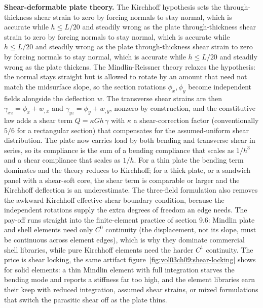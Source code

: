 \begin{mastery}
\textbf{Shear-deformable plate theory.} The Kirchhoff hypothesis sets the
through-thickness shear strain to zero by forcing normals to stay normal,
which is accurate while $h \le L/20$ and steadily wrong as the plate
through-thickness shear strain to zero by forcing normals to stay normal,
which is accurate while $h \le L/20$ and steadily wrong as the plate
through-thickness shear strain to zero by forcing normals to stay normal,
which is accurate while $h \le L/20$ and steadily wrong as the plate
thickens. The Mindlin-Reissner theory relaxes the hypothesis: the normal
stays straight but is allowed to rotate by an amount that need not match
the midsurface slope, so the section rotations $\phi_x, \phi_y$ become
independent fields alongside the deflection $w$. The transverse shear
strains are then $\gamma_{xz} = \phi_x + w_{,x}$ and $\gamma_{yz} = \phi_y
+ w_{,y}$, nonzero by construction, and the constitutive law adds a shear
term $Q = \kappa G h\,\gamma$ with $\kappa$ a shear-correction factor
(conventionally $5/6$ for a rectangular section) that compensates for the
assumed-uniform shear distribution. The plate now carries load by both
bending and transverse shear in series, so its compliance is the sum of a
bending compliance that scales as $1/h^3$ and a shear compliance that
scales as $1/h$. For a thin plate the bending term dominates and the theory
reduces to Kirchhoff; for a thick plate, or a sandwich panel with a
shear-soft core, the shear term is comparable or larger and the Kirchhoff
deflection is an underestimate. The three-field formulation also removes
the awkward Kirchhoff effective-shear boundary condition, because the
independent rotations supply the extra degrees of freedom an edge needs.
The pay-off runs straight into the finite-element practice of section 9.6:
Mindlin plate and shell elements need only $C^0$ continuity (the
displacement, not its slope, must be continuous across element edges),
which is why they dominate commercial shell libraries, while pure
Kirchhoff elements need the harder $C^1$ continuity. The price is shear
locking, the same artifact figure~\ref{fig:vol03ch09:shear-locking} shows
for solid elements: a thin Mindlin element with full integration starves
the bending mode and reports a stiffness far too high, and the element
libraries earn their keep with reduced integration, assumed shear strains,
or mixed formulations that switch the parasitic shear off as the plate
thins.
\end{mastery}

